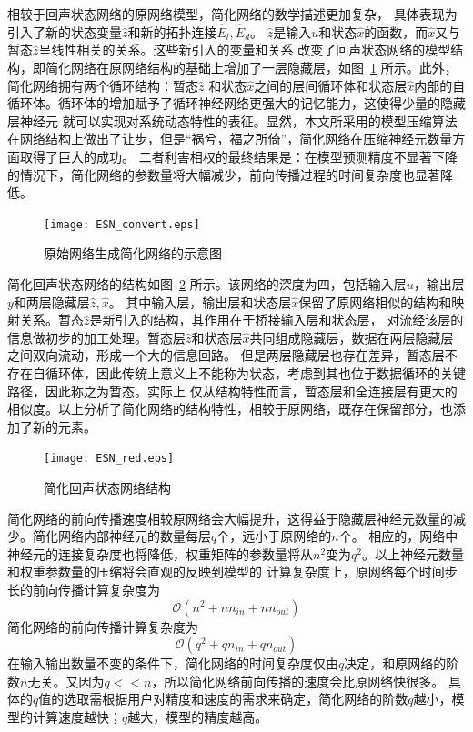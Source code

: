 相较于回声状态网络的原网络模型，简化网络的数学描述更加复杂， 具体表现为引入了新的状态变量\(\widehat{z}\)和新的拓扑连接\(\widehat{E}_l,\widehat{E}_d\)。
\(\widehat{z}\)是输入\(u\)和状态\(\widehat{x}\)的函数，而\(\widehat{x}\)又与暂态\(\widehat{z}\)呈线性相关的关系。这些新引入的变量和关系
改变了回声状态网络的模型结构，即简化网络在原网络结构的基础上增加了一层隐藏层，如图~\ref{fig:esn_convert} 所示。此外，简化网络拥有两个循环结构：暂态\(\widehat{z}\)
和状态\(\widehat{x}\)之间的层间循环体和状态层\(\widehat{x}\)内部的自循环体。循环体的增加赋予了循环神经网络更强大的记忆能力，这使得少量的隐藏层神经元
就可以实现对系统动态特性的表征。显然，本文所采用的模型压缩算法在网络结构上做出了让步，但是“祸兮，福之所倚”，简化网络在压缩神经元数量方面取得了巨大的成功。
二者利害相权的最终结果是：在模型预测精度不显著下降的情况下，简化网络的参数量将大幅减少，前向传播过程的时间复杂度也显著降低。
\begin{figure}
	\centering
	\texttt{[image: ESN\_convert.eps]}
	\caption{原始网络生成简化网络的示意图}
	\label{fig:esn_convert}
\end{figure}

简化回声状态网络的结构如图~\ref{fig:esn_red} 所示。该网络的深度为四，包括输入层\(u\)，输出层\(y\)和两层隐藏层\(\widehat{z},\widehat{x}\)。
其中输入层，输出层和状态层\(\widehat{x}\)保留了原网络相似的结构和映射关系。暂态\(\widehat{z}\)是新引入的结构，其作用在于桥接输入层和状态层，
对流经该层的信息做初步的加工处理。暂态层\(\widehat{z}\)和状态层\(\widehat{x}\)共同组成隐藏层，数据在两层隐藏层之间双向流动，形成一个大的信息回路。
但是两层隐藏层也存在差异，暂态层不存在自循环体，因此传统上意义上不能称为状态，考虑到其也位于数据循环的关键路径，因此称之为暂态。实际上
仅从结构特性而言，暂态层和全连接层有更大的相似度。以上分析了简化网络的结构特性，相较于原网络，既存在保留部分，也添加了新的元素。 

\begin{figure}
	\centering
	\texttt{[image: ESN\_red.eps]}
	\caption{简化回声状态网络结构}
	\label{fig:esn_red}
\end{figure}

简化网络的前向传播速度相较原网络会大幅提升，这得益于隐藏层神经元数量的减少。简化网络内部神经元的数量每层\(q\)个，远小于原网络的\(n\)个。
相应的，网络中神经元的连接复杂度也将降低，权重矩阵的参数量将从\(n^2\)变为\(q^2\)。以上神经元数量和权重参数量的压缩将会直观的反映到模型的
计算复杂度上，原网络每个时间步长的前向传播计算复杂度为
\begin{equation}
	\mathcal{O}(n^2 + n n_{in} + n n_{out})
\end{equation}
简化网络的前向传播计算复杂度为
\begin{equation}
	\mathcal{O}(q^2 + q n_{in} + q n_{out})
	\label{eq:computeComplexity}
\end{equation}
在输入输出数量不变的条件下，简化网络的时间复杂度仅由\(q\)决定，和原网络的阶数\(n\)无关。又因为\(q<<n\)，所以简化网络前向传播的速度会比原网络快很多。
具体的\(q\)值的选取需根据用户对精度和速度的需求来确定，简化网络的阶数\(q\)越小，模型的计算速度越快；\(q\)越大，模型的精度越高。

